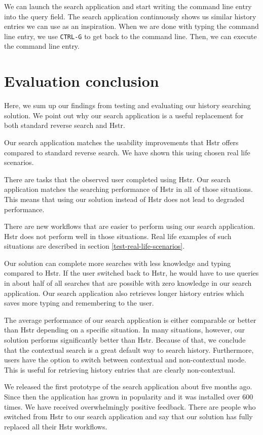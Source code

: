 
We can launch the search application and start writing the command line entry into the query field. The search application continuously shows us similar history entries we can use as an inspiration. When we are done with typing the command line entry, we use \verb|CTRL-G| to get back to the command line. Then, we can execute the command line entry.


\section{Evaluation conclusion}

Here, we sum up our findings from testing and evaluating our history searching solution. We point out why our search application is a useful replacement for both standard reverse search and Hstr. 

Our search application matches the usability improvements that Hstr offers compared to standard reverse search. We have shown this using chosen real life scenarios.

There are tasks that the observed user completed using Hstr. Our search application matches the searching performance of Hstr in all of those situations. This means that using our solution instead of Hstr does not lead to degraded performance.

There are new workflows that are easier to perform using our search application. Hstr does not perform well in those situations. Real life examples of such situations are described in section \ref{test-real-life-scenarios}.

Our solution can complete more searches with less knowledge and typing compared to Hstr. If the user switched back to Hstr, he would have to use queries in about half of all searches that are possible with zero knowledge in our search application. Our search application also retrieves longer history entries which saves more typing and remembering to the user.

The average performance of our search application is either comparable or better than Hstr depending on a specific situation. In many situations, however, our solution performs significantly better than Hstr. Because of that, we conclude that the contextual search is a great default way to search history. Furthermore, users have the option to switch between contextual and non-contextual mode. This is useful for retrieving history entries that are clearly non-contextual.
    
We released the first prototype of the search application about five months ago. Since then the application has grown in popularity and it was installed over 600 times. We have received overwhelmingly positive feedback. There are people who switched from Hstr to our search application and say that our solution has fully replaced all their Hstr workflows.



